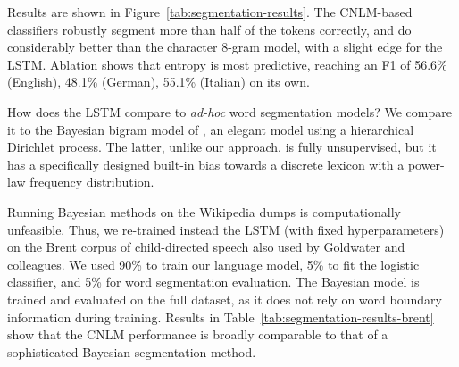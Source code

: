 


Results are shown in Figure~\ref{tab:segmentation-results}. The
CNLM-based classifiers robustly segment more than half of the tokens
correctly, and do considerably better than the character 8-gram model,
with a slight edge for the LSTM. Ablation shows that entropy is most
predictive, reaching an F1 of 56.6\% (English), 48.1\% (German), 55.1\%
(Italian) on its own.%

How does the LSTM  compare to \emph{ad-hoc} word segmentation
models?  We compare it to the Bayesian bigram model of
, an elegant model using a
hierarchical Dirichlet process.  The latter, unlike our approach, is
fully unsupervised, but it has a specifically designed built-in bias
towards a discrete lexicon with a power-law frequency distribution.

Running Bayesian methods on the Wikipedia dumps is computationally
unfeasible. Thus, we re-trained instead the LSTM (with fixed
hyperparameters) on the Brent corpus of child-directed speech
\cite{brent-efficient-1999} also used by Goldwater and colleagues.  We
used 90\% to train our language model, 5\% to fit the logistic
classifier, and 5\% for word segmentation evaluation.  The Bayesian
model is trained and evaluated on the full dataset, as it does not
rely on word boundary information during training. Results in
Table~\ref{tab:segmentation-results-brent} show that the CNLM
performance is broadly comparable to that of a sophisticated Bayesian
segmentation method.

